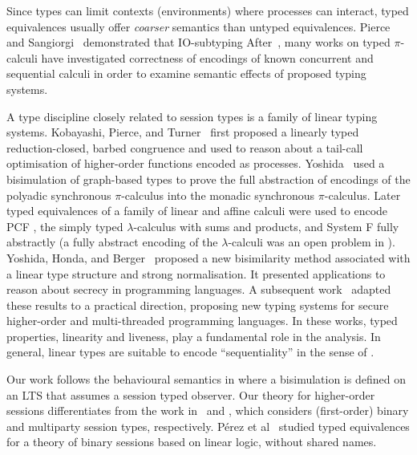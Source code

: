 
 Since types can limit
contexts (environments) where processes can interact, typed equivalences
usually offer {\em coarser} semantics than untyped equivalences.
Pierce and Sangiorgi~\cite{PiSa96b} demonstrated that IO-subtyping 
After~\cite{PiSa96b}, many works on typed $\pi$-calculi 
have investigated correctness of encodings of known concurrent and
sequential calculi in order to examine semantic
effects of proposed typing systems. 

A  type discipline closely related
to session types is a family of linear typing systems. Kobayashi, Pierce, and Turner~\cite{LinearPi} first proposed a linearly typed reduction-closed, barbed congruence and 
used to 
reason about a tail-call optimisation of higher-order functions 
encoded 
as processes. 
Yoshida~\cite{Yoshida96} 
used a bisimulation of graph-based types to prove the full abstraction
of encodings of the polyadic synchronous $\pi$-calculus into the
monadic synchronous $\pi$-calculus. 
Later typed equivalences of a
family of linear and affine calculi \cite{BHY,DBLP:journals/iandc/YoshidaBH04,BergerHY05} 
were used to encode 
PCF \cite{Plotkin1977223,Milner19771}, the simply typed $\lambda$-calculus with sums and products, and System F \cite{GirardJY:protyp}
fully abstractly (a fully abstract encoding of the $\lambda$-calculi 
was an open problem in \cite{MilnerR:funp}).  
Yoshida, Honda, and Berger~\cite{YHB02} proposed a new bisimilarity
method associated with a linear type structure and strong
normalisation. 
It presented applications to reason about secrecy in programming languages. 
A subsequent work~\cite{HY02} adapted these results
to a practical direction, proposing new typing
systems for secure higher-order and multi-threaded programming 
languages. 
In these works, typed properties, linearity and liveness, 
play a fundamental role in the analysis. In general, linear types 
are suitable to encode ``sequentiality'' in the sense of 
\cite{HylandJME:fulapi,AbramskyS:fulap}.

 
 {Our work follows 
the 
behavioural semantics in 
\cite{KYHH2015,KY2015,DBLP:journals/iandc/PerezCPT14}
where a bisimulation is defined on an LTS 
that assumes a session typed
observer.
Our theory for higher-order sessions 
differentiates from 
the work in~\cite{KYHH2015} and \cite{KY2015}, which 
considers  (first-order)
binary and multiparty session types, respectively.
P\'{e}rez et al~\cite{DBLP:journals/iandc/PerezCPT14} studied typed equivalences
for a 
theory of binary sessions based on linear logic,
without shared names.}




